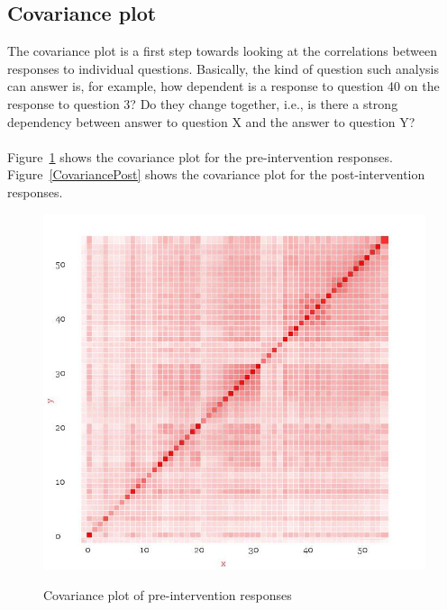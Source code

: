 \documentclass[10pt]{article}
\begin{document}
\subsection{Covariance plot}
\label{sec:CovariancePlots}
The covariance plot is a first step towards looking at the correlations between responses to individual questions. Basically, the kind of question such analysis can answer is, for example, how dependent is a response to question 40 on the response to question 3? Do they change together, i.e., is there a strong dependency between answer to question X and the answer to question Y?\\\\
Figure~\ref{CovariancePre} shows the covariance plot for the pre-intervention responses.\\
Figure~\ref{CovariancePost} shows the covariance plot for the post-intervention responses.\\
\begin{figure}
\caption{Covariance plot of pre-intervention responses}
\label{CovariancePre}
\begin{center}
\includegraphics[width=120mm]{ReportMedia/CovariancePre.jpg}\\
\end{center}
\end{figure}
\end{document}
